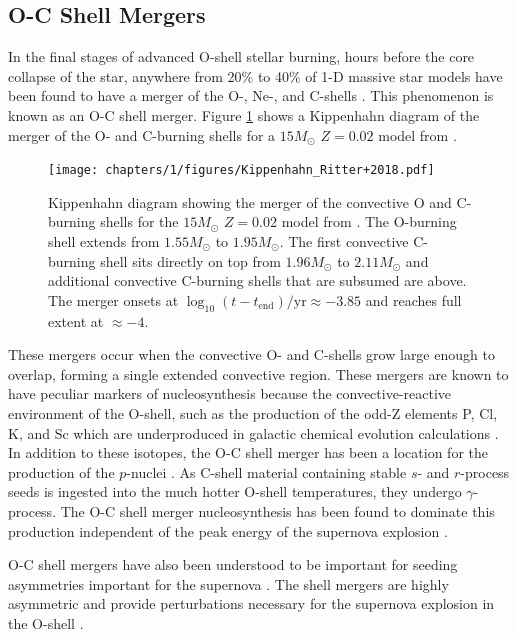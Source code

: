 \subsection{O-C Shell Mergers}

In the final stages of advanced O-shell stellar burning, hours before the core collapse of the star, anywhere from 20\% to 40\% of 1-D massive star models have been found to have a merger of the O-, Ne-, and C-shells \cite{rauscherNucleosynthesisMassiveStars2002, ritterConvectivereactiveNucleosynthesisSc2018, collinsPropertiesConvectiveOxygen2018, robertiGprocessNucleosynthesisCorecollapse2023, robertiOccurrenceImpactCarbonOxygen2025}.
This phenomenon is known as an O-C shell merger.
Figure \ref{fig:kippenhahn_ritter} shows a Kippenhahn diagram of the merger of the O- and C-burning shells for a $15M_\odot$ $Z=0.02$ model from \cite{ritterNuGridStellarData2018}.

\begin{figure}[!htbp]
\texttt{[image: chapters/1/figures/Kippenhahn\_Ritter+2018.pdf]}
\caption{Kippenhahn diagram showing the merger of the convective O and C-burning shells for the $15M_\odot$ $Z=0.02$ model from \cite{ritterNuGridStellarData2018}. The O-burning shell extends from $1.55 M_\odot$ to $1.95 M_\odot$. The first convective C-burning shell sits directly on top from $1.96 M_\odot$ to $2.11 M_\odot$ and additional convective C-burning shells that are subsumed are above. The merger onsets at $\log_{10}(t-t_{\mathrm{end}}) /\mathrm{yr} \approx -3.85$ and reaches full extent at $\approx-4$.
\label{fig:kippenhahn_ritter}}
\end{figure}

These mergers occur when the convective O- and C-shells grow large enough to overlap, forming a single extended convective region.
These mergers are known to have peculiar markers of nucleosynthesis because the convective-reactive environment of the O-shell, such as the production of the odd-Z elements P, Cl, K, and Sc which are underproduced in galactic chemical evolution calculations \cite{ritterConvectivereactiveNucleosynthesisSc2018,robertiOccurrenceImpactCarbonOxygen2025}.
In addition to these isotopes, the O-C shell merger has been a location for the production of the $p$-nuclei \cite{rauscherNucleosynthesisMassiveStars2002, ritterConvectivereactiveNucleosynthesisSc2018, robertiGprocessNucleosynthesisCorecollapse2023}.
As C-shell material containing stable $s$- and $r$-process seeds is ingested into the much hotter O-shell temperatures, they undergo $\gamma$-process.
The O-C shell merger nucleosynthesis has been found to dominate this production independent of the peak energy of the supernova explosion \cite{robertiGprocessNucleosynthesisCorecollapse2024b}. 

O-C shell mergers have also been understood to be important for seeding asymmetries important for the supernova \cite{mullerStatusMultiDimensionalCoreCollapse2016, collinsPropertiesConvectiveOxygen2018, mullerHydrodynamicsCorecollapseSupernovae2020, yadavLargescaleMixingViolent2020a, andrassy3DHydrodynamicSimulations2020}.
The shell mergers are highly asymmetric and provide perturbations necessary for the supernova explosion in the O-shell \cite{collinsPropertiesConvectiveOxygen2018}.